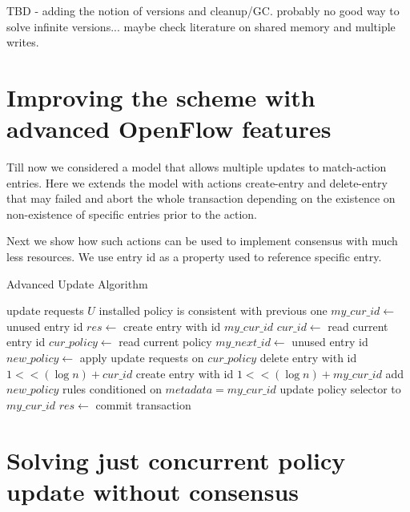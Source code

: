 \documentclass[conference]{sigcomm-alternate}
\begin{document}
TBD - adding the notion of versions and cleanup/GC. probably no good way to solve infinite versions... maybe check literature on shared memory and multiple writes.


\section{Improving the scheme with advanced OpenFlow features}\label{sec:todo}
Till now we considered a model that allows multiple updates to match-action entries. Here we extends the model with actions create-entry and delete-entry that may failed and abort the whole transaction depending on the existence on non-existence of specific entries prior to the action.

Next we show how such actions can be used to implement consensus with much less resources. We use entry id as a property used to reference specific entry.

\begin{algorithm}[t]
    \caption{Advanced Update Algorithm}
    \label{alg:template}
    \begin{algorithmic}[1]    
    \Require update requests $U$
    \Ensure installed policy is consistent with previous one
		\Repeat 
			\State $my\_cur\_id\gets$ unused entry id 
    		\State $res \gets $ create entry with id $my\_cur\_id$
    \EndIf
 		\Repeat 
 			\State $cur\_id\gets$ read current entry id 
 			\State $cur\_policy\gets$ read current policy
 			\State $my\_next\_id\gets$ unused entry id 
 			\State $new\_policy\gets$ apply update requests on $cur\_policy$
 			\startTransaction
	 			\State delete entry with id $1<<(\log n) + cur\_id$
	 			\State create entry with id $1<<(\log n) + my\_cur\_id$
	 			\State add $new\_policy$ rules conditioned on $metadata=my\_cur\_id$
	 			\State update policy selector to $my\_cur\_id$
 			\endTransaction
     		\State $res \gets $ commit transaction 

    \end{algorithmic}
\end{algorithm}
    

\section{Solving just concurrent policy update without consensus}\label{sec:todo}
\end{document}
